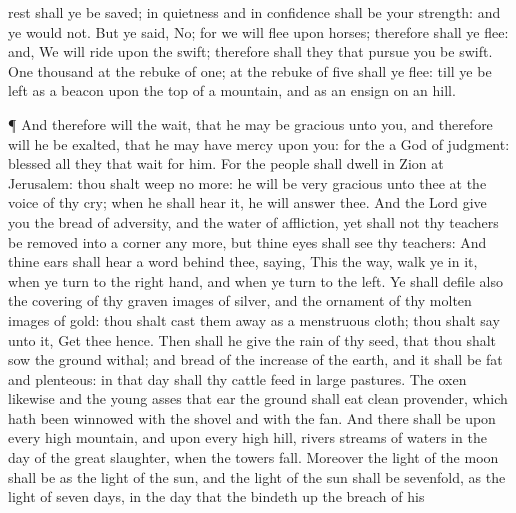 {rest shall ye be
saved; in
quietness and in
confidence shall be your
strength: and ye
would not.
But ye
said, No; for we will
flee upon
horses; therefore shall ye
flee: and, We will
ride upon the
swift; therefore shall they that
pursue you be
swift.
One
thousand
{}
at the
rebuke of
one;
at the
rebuke of
five shall ye
flee: till ye be
left as a
beacon upon the
top of a
mountain, and as an
ensign on an
hill.
\par }{\PP {}¶ And therefore will the
{}
wait, that he may be
gracious unto you, and therefore will he be
exalted, that he may have
mercy upon you: for the
{}
{} a
God of
judgment:
blessed
{} all they that
wait for him.
For the
people shall
dwell in
Zion at
Jerusalem: thou shalt
weep no
more: he will be
very
gracious unto thee at the
voice of thy
cry; when he shall
hear it, he will
answer thee.
And
{} the
Lord
give you the
bread of
adversity, and the
water of
affliction, yet shall not thy
teachers be removed into a
corner any more, but thine
eyes shall
see thy
teachers:
And thine
ears shall
hear a
word
behind thee,
saying, This
{} the
way, walk ye in
it, when ye turn to the right
hand, and when ye turn to the
left.
Ye shall
defile also the
covering of thy graven
images of
silver, and the
ornament of thy molten
images of
gold: thou shalt cast them
away as a menstruous
cloth; thou shalt
say unto it, Get thee
hence.
Then shall he
give the
rain of thy
seed, that thou shalt
sow the
ground withal; and
bread of the
increase of the
earth, and it shall be
fat and
plenteous: in that
day shall thy
cattle
feed in
large
pastures.
The
oxen likewise and the young
asses that
ear the
ground shall
eat
clean
provender, which hath been
winnowed with the
shovel and with the
fan.
And there shall be upon every
high
mountain, and upon every
high
hill,
rivers
{}
streams of
waters in the
day of the
great
slaughter, when the
towers
fall.
Moreover the
light of the
moon shall be as the
light of the
sun, and the
light of the
sun shall be
sevenfold, as the
light of
seven
days, in the
day that the
{} bindeth
up the
breach of his
}
